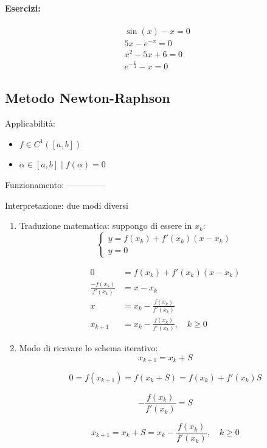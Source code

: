 \documentclass[a4paper, 11pt]{article}
\begin{document}
        \paragraph{Esercizi: }

        \begin{align*}
            & \sin(x) - x = 0 \quad \\
            & 5x - e^{-x} = 0 \quad \\
            & x^2 - 5x + 6 = 0 \quad \\
            & e^{-\frac{x}{4}} - x = 0 \quad
        \end{align*}

    

        \subsection{Metodo Newton-Raphson}
        Applicabilità:
        \begin{itemize}
            \item \( f \in C^1([a,b]) \)
            \item \( \alpha \in [a,b] \mid f(\alpha) = 0 \)
        \end{itemize}

        Funzionamento:
        --------------

        Interpretazione:
        due modi diversi 
        \begin{enumerate}
            \item Traduzione matematica:
            suppongo di essere in \( x_k \):
            \[
            \begin{cases}
            y = f(x_k)+f'(x_k)(x-x_k) \\
            y = 0
            \end{cases}
            \]

            \[
            \begin{aligned}
            0 &= f(x_k)+f'(x_k)(x-x_k) \\
            \frac{-f(x_k)}{f'(x_k)} &= x-x_k \\
            x &= x_k - \frac{f(x_k)}{f'(x_k)} \\
            x_{k+1} &= x_k -\frac{f(x_k)}{f'(x_k)}, \quad k \geq 0
            \end{aligned}
            \]

            \item Modo di ricavare lo schema iterativo:
            \[
            x_{k+1} = x_k + S
            \]

            \[
            0 = f(x_{k+1}) = f(x_k+S) = f(x_k) + f'(x_k) S
            \]

            \[
            -\frac{f(x_k)}{f'(x_k)} = S
            \]

            \[
            x_{k+1} = x_k + S = x_k-\frac{f(x_k)}{f'(x_k)}, \quad k \geq 0
            \]
        \end{enumerate}
\end{document}

